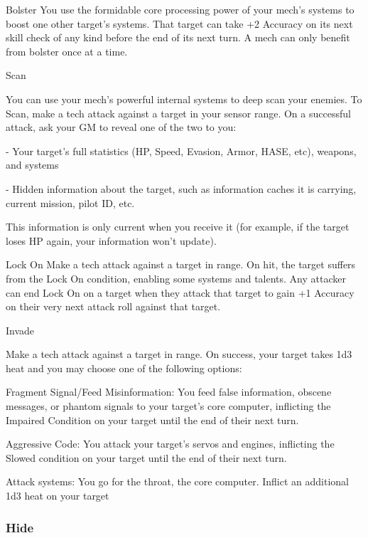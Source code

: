 Bolster
You use the formidable core processing power of your mech’s systems to boost one other
target’s systems. That target can take +2 Accuracy on its next skill check of any kind before the
end of its next turn. A mech can only benefit from bolster once at a time.


Scan

You can use your mech’s powerful internal systems to deep scan your enemies.
To Scan, make a tech attack against a target in your sensor range. On a successful attack, ask
your GM to reveal one of the two to you:

             -   Your target’s full statistics (HP, Speed, Evasion, Armor, HASE, etc), weapons, and
                 systems

             -   Hidden information about the target, such as information caches it is carrying,
                 current mission, pilot ID, etc.

This information is only current when you receive it (for example, if the target loses HP again,
your information won’t update).


Lock On
Make a tech attack against a target in range. On hit, the target suffers from the Lock On
condition, enabling some systems and talents. Any attacker can end Lock On on a target when
they attack that target to gain +1 Accuracy on their very next attack roll against that target.


Invade

Make a tech attack against a target in range. On success, your target takes 1d3 heat and you
may choose one of the following options:





         Fragment Signal/Feed Misinformation: You feed false information, obscene messages,
         or phantom signals to your target’s core computer, inflicting the Impaired Condition on
         your target until the end of their next turn.


         Aggressive Code: You attack your target’s servos and engines, inflicting the Slowed
         condition on your target until the end of their next turn.


         Attack systems: You go for the throat, the core computer. Inflict an additional 1d3 heat
         on your target

\subsubsection{Hide}

